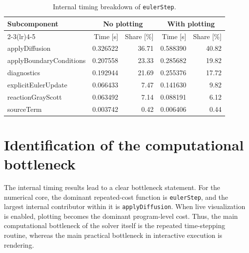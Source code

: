 \begin{table}[htbp]
    \centering
    \caption{Internal timing breakdown of \texttt{eulerStep}.}
    \label{tab:ch9_eulerstep_breakdown}
    \begin{tabular}{lrrrr}
        \toprule
        \multirow{2}{*}{Subcomponent} & \multicolumn{2}{c}{No plotting} & \multicolumn{2}{c}{With plotting} \\
        \cmidrule(lr){2-3}\cmidrule(lr){4-5}
         & Time [s] & Share [\%] & Time [s] & Share [\%] \\
        \midrule
        applyDiffusion          & 0.326522 & 36.71 & 0.588390 & 40.82 \\
        applyBoundaryConditions & 0.207558 & 23.33 & 0.285682 & 19.82 \\
        diagnostics             & 0.192944 & 21.69 & 0.255376 & 17.72 \\
        explicitEulerUpdate     & 0.066433 & 7.47  & 0.141630 & 9.82 \\
        reactionGrayScott       & 0.063492 & 7.14  & 0.088191 & 6.12 \\
        sourceTerm              & 0.003742 & 0.42  & 0.006406 & 0.44 \\
        \bottomrule
    \end{tabular}
\end{table}

\section{Identification of the computational bottleneck}

The internal timing results lead to a clear bottleneck statement. For the numerical core, the dominant repeated-cost function is \texttt{eulerStep}, and the largest internal contributor within it is \texttt{applyDiffusion}. When live visualization is enabled, plotting becomes the dominant program-level cost. Thus, the main computational bottleneck of the solver itself is the repeated time-stepping routine, whereas the main practical bottleneck in interactive execution is rendering.